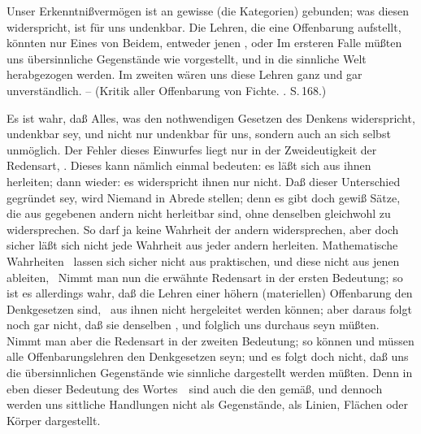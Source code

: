 Unser Erkenntnißvermögen ist an gewisse  (die Kategorien) gebunden; was diesen widerspricht, ist für uns undenkbar. Die Lehren, die eine Offenbarung aufstellt, könnten nur Eines von Beidem, entweder jenen , oder  Im ersteren Falle müßten uns übersinnliche Gegenstände wie  vorgestellt, und in die sinnliche Welt herabgezogen werden. Im zweiten wären uns diese Lehren ganz und gar unverständlich. -- (Kritik aller Offenbarung von Fichte. . S.\,168.)\par
{} Es ist wahr, daß Alles, was den nothwendigen Gesetzen des Denkens widerspricht, undenkbar sey, und nicht nur undenkbar für uns, sondern auch an sich selbst unmöglich. Der Fehler dieses Einwurfes liegt nur in der Zweideutigkeit der Redensart, . Dieses kann nämlich einmal bedeuten: es läßt sich aus ihnen herleiten; dann wieder: es widerspricht ihnen nur nicht. Daß dieser Unterschied gegründet sey, wird Niemand in Abrede stellen; denn es gibt doch gewiß Sätze, die aus gegebenen andern nicht herleitbar sind, ohne denselben gleichwohl zu widersprechen. So darf ja keine Wahrheit der andern widersprechen, aber doch sicher läßt sich nicht jede Wahrheit aus jeder andern herleiten. Mathematische Wahrheiten \zB\ lassen sich sicher nicht aus praktischen, und diese nicht aus jenen ableiten, \usw\ Nimmt man nun die erwähnte Redensart in der ersten Bedeutung; so ist es allerdings wahr, daß die Lehren einer höhern (materiellen) Offenbarung den Denkgesetzen  sind, \dh\ aus ihnen nicht hergeleitet werden können; aber daraus folgt noch gar nicht, daß sie denselben , und folglich uns durchaus  seyn müßten. Nimmt man aber die Redensart in der zweiten Bedeutung; so können und müssen alle Offenbarungslehren den Denkgesetzen  seyn; und es folgt doch nicht, daß uns die übersinnlichen Gegenstände wie sinnliche dargestellt werden müßten. Denn in eben dieser Bedeutung des Wortes~\ sind auch die  den  gemäß, und dennoch werden uns sittliche Handlungen nicht als  Gegenstände, als Linien, Flächen oder Körper dargestellt.

